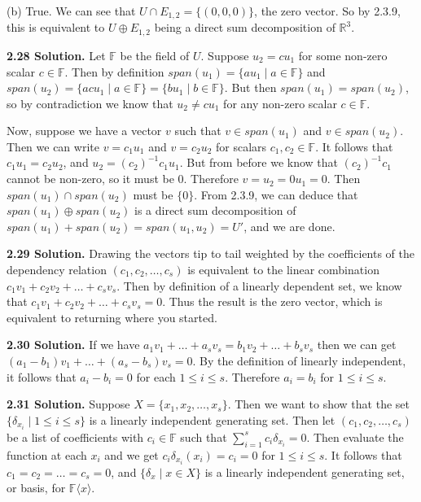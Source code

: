 (b) True. We can see that $U \cap E_{1,2} = \{(0,0,0)\}$, the zero vector. So by 2.3.9, this is equivalent to $U \oplus E_{1,2}$ being a direct sum decomposition of $\mathbb{R}^3$.

\textbf{2.28 Solution.} Let $\mathbb{F}$ be the field of $U$. Suppose $u_2 = cu_1$ for some non-zero scalar $c \in \mathbb{F}$. Then by definition $span(u_1) = \{au_1 \mid a \in \mathbb{F}\}$ and $span(u_2) = \{acu_1 \mid a \in \mathbb{F}\} = \{bu_1 \mid b \in \mathbb{F}\}$. But then $span(u_1) = span(u_2)$, so by contradiction we know that $u_2 \neq cu_1$ for any non-zero scalar $c \in \mathbb{F}$.

Now, suppose we have a vector $v$ such that $v \in span(u_1)$ and $v \in span(u_2)$. Then we can write $v = c_1u_1$ and $v = c_2u_2$ for scalars $c_1,c_2 \in \mathbb{F}$. It follows that $c_1u_1 = c_2u_2$, and $u_2 = (c_2)^{-1}c_1u_1$. But from before we know that $(c_2)^{-1}c_1$ cannot be non-zero, so it must be 0. Therefore $v = u_2 = 0u_1 = 0$. Then $span(u_1) \cap span(u_2)$ must be $\{0\}$. From 2.3.9, we can deduce that $span(u_1) \oplus span(u_2)$ is a direct sum decomposition of $span(u_1) + span(u_2) = span(u_1,u_2) = U'$, and we are done.

\textbf{2.29 Solution.} Drawing the vectors tip to tail weighted by the coefficients of the dependency relation $(c_1,c_2,\ldots,c_s)$ is equivalent to the linear combination $c_1v_1 + c_2v_2 + \ldots + c_sv_s$. Then by definition of a linearly dependent set, we know that $c_1v_1 + c_2v_2 + \ldots + c_sv_s = 0$. Thus the result is the zero vector, which is equivalent to returning where you started.

\textbf{2.30 Solution.} If we have $a_1v_1 + \ldots + a_sv_s = b_1v_2 + \ldots + b_sv_s$ then we can get $(a_1-b_1)v_1 + \ldots + (a_s-b_s)v_s = 0$. By the definition of linearly independent, it follows that $a_i-b_i = 0$ for each $1 \leq i \leq s$. Therefore $a_i = b_i$ for $1 \leq i \leq s$.

\textbf{2.31 Solution.} Suppose $X = \{x_1,x_2,\ldots,x_s\}$. Then we want to show that the set $\{\delta_{x_i} \mid 1 \leq i \leq s\}$ is a linearly independent generating set. Then let $(c_1,c_2,\ldots,c_s)$ be a list of coefficients with $c_i \in \mathbb{F}$ such that $\sum\limits_{i=1}^s c_i\delta_{x_i} = 0$. Then evaluate the function at each $x_i$ and we get $c_i\delta_{x_i}(x_i) = c_i = 0$ for $1 \leq i \leq s$. It follows that $c_1 = c_2 = \ldots = c_s = 0$, and $\{\delta_x \mid x \in X\}$ is a linearly independent generating set, or basis, for $\mathbb{F}\langle x \rangle$.

